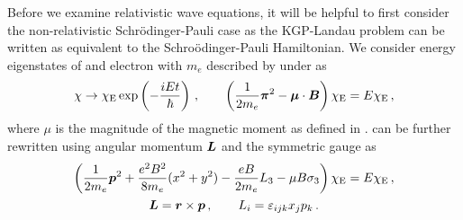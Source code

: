 Before we examine relativistic wave equations, it will be helpful to first consider the non-relativistic Schr{\"o}dinger-Pauli case as the KGP-Landau problem can be written as equivalent to the Schro{\"o}dinger-Pauli Hamiltonian. We consider energy eigenstates of and electron with $m_{e}$ described by  under  as
\begin{alignat}{1}
	\label{homogeneous:3} \chi\rightarrow\chi_\mathrm{E}\exp\left(-\frac{iEt}{\hbar}\right)\,,\qquad\left(\frac{1}{2m_{e}}\boldsymbol{\pi}^{2}-\boldsymbol{\mu}\cdot\boldsymbol{B}\right)\chi_\mathrm{E}=E\chi_\mathrm{E}\,,
\end{alignat}
where $\mu$ is the magnitude of the magnetic moment as defined in .  can be further rewritten using angular momentum $\boldsymbol{L}$ and the symmetric gauge  as
\begin{gather}
	\label{homogeneous:4} \left(\frac{1}{2m_{e}}\boldsymbol{p}^{2}+\frac{e^{2}B^{2}}{8m_{e}}(x^{2}+y^{2})-\frac{eB}{2m_{e}}L_{3}-\mu B\sigma_{3}\right)\chi_\mathrm{E}=E\chi_\mathrm{E}\,,\\
    \boldsymbol{L}=\boldsymbol{r}\times\boldsymbol{p}\,,\qquad L_{i}=\varepsilon_{ijk}x_{j}p_{k}\,.
\end{gather}

